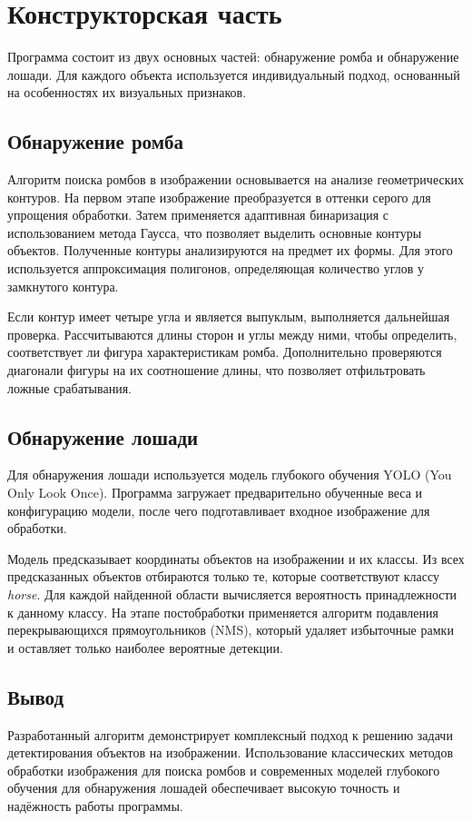 \chapter{Конструкторская часть}

Программа состоит из двух основных частей: обнаружение ромба и обнаружение лошади. 
Для каждого объекта используется индивидуальный подход, основанный на особенностях их визуальных признаков.

\section{Обнаружение ромба}

Алгоритм поиска ромбов в изображении основывается на анализе геометрических контуров. 
На первом этапе изображение преобразуется в оттенки серого для упрощения обработки. 
Затем применяется адаптивная бинаризация с использованием метода Гаусса, что позволяет выделить основные контуры объектов. 
Полученные контуры анализируются на предмет их формы. Для этого используется аппроксимация полигонов, определяющая количество углов у замкнутого контура.

Если контур имеет четыре угла и является выпуклым, выполняется дальнейшая проверка. 
Рассчитываются длины сторон и углы между ними, чтобы определить, соответствует ли фигура характеристикам ромба. 
Дополнительно проверяются диагонали фигуры на их соотношение длины, что позволяет отфильтровать ложные срабатывания. 

\section{Обнаружение лошади}

Для обнаружения лошади используется модель глубокого обучения YOLO (You Only Look Once). 
Программа загружает предварительно обученные веса и конфигурацию модели, после чего подготавливает входное изображение для обработки. 

Модель предсказывает координаты объектов на изображении и их классы. 
Из всех предсказанных объектов отбираются только те, которые соответствуют классу \textit{horse}. 
Для каждой найденной области вычисляется вероятность принадлежности к данному классу. 
На этапе постобработки применяется алгоритм подавления перекрывающихся прямоугольников (NMS), 
который удаляет избыточные рамки и оставляет только наиболее вероятные детекции. 

\section*{Вывод}

Разработанный алгоритм демонстрирует комплексный подход к решению задачи детектирования объектов на изображении. 
Использование классических методов обработки изображения для поиска ромбов и современных моделей глубокого обучения 
для обнаружения лошадей обеспечивает высокую точность и надёжность работы программы. 

\clearpage
